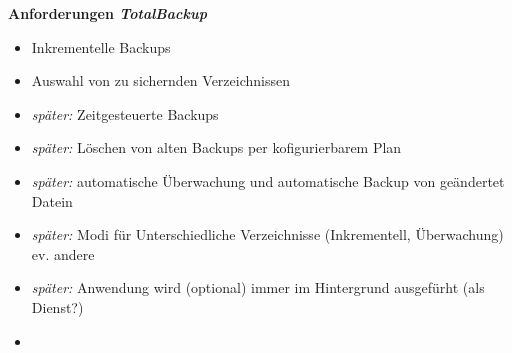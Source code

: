 \documentclass[a4paper,10pt]{report}
\begin{document}
\begin{center}
 \textbf{\huge{Anforderungen} \textit{TotalBackup}}
\end{center}

 \begin{itemize}
  \item Inkrementelle Backups
  \item Auswahl von zu sichernden Verzeichnissen
  \item \textit{später:} Zeitgesteuerte Backups
  \item \textit{später:} Löschen von alten Backups per kofigurierbarem Plan
  \item \textit{später:} automatische Überwachung und automatische Backup von geändertet Datein
  \item \textit{später:} Modi für Unterschiedliche Verzeichnisse (Inkrementell, Überwachung) ev. andere
  \item \textit{später:} Anwendung wird (optional) immer im Hintergrund ausgefürht (als Dienst?)
  \item 
 \end{itemize}
\end{document}
